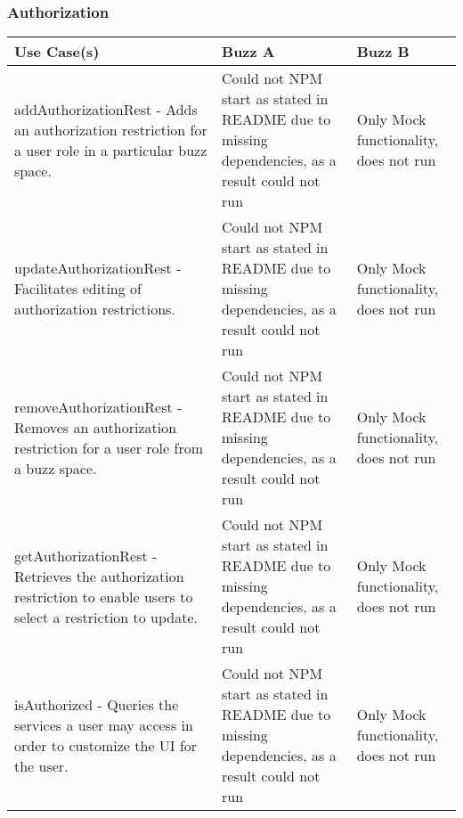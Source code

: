 \documentclass[12pt]{article}
\begin{document}
\subsubsection{Authorization}%
\begin{tabular}{|p{4.5cm}|p{4.5cm}|p{4.5cm}|}

\hline
Use Case(s) & Buzz A & Buzz B \\ 
\hline
addAuthorizationRest - Adds an authorization restriction for a user role in a particular buzz space. & Could not NPM start as stated in README due to missing dependencies, as a result could not run & Only Mock functionality, does not run\\ %
\hline
updateAuthorizationRest - Facilitates editing of authorization restrictions. &  Could not NPM start as stated in README due to missing dependencies, as a result could not run & Only Mock functionality, does not run\\ %
\hline
removeAuthorizationRest - Removes an authorization restriction for a user role from a buzz space. &  Could not NPM start as stated in README due to missing dependencies, as a result could not run & Only Mock functionality, does not run\\ %
\hline
getAuthorizationRest - Retrieves the authorization restriction to enable users to select a restriction to update. &  Could not NPM start as stated in README due to missing dependencies, as a result could not run & Only Mock functionality, does not run\\ %
\hline
isAuthorized - Queries the services a user may access in order to customize the UI for the user. & Could not NPM start as stated in README due to missing dependencies, as a result could not run& Only Mock functionality, does not run\\ %
\hline

\end{tabular}
\end{document}
